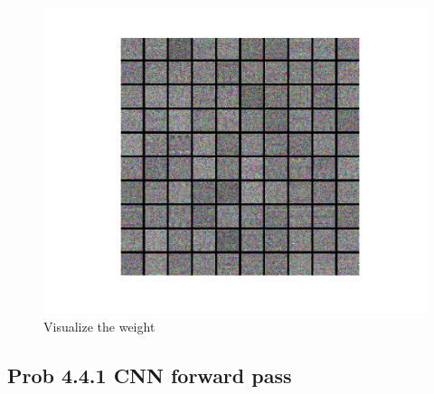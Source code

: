 \documentclass[12pt]{article}
\begin{document}
\begin{figure}[H]
  \caption{Visualize the weight}
  \centering
    \includegraphics[scale=0.5]{visual.png}
\end{figure}


\subsection*{Prob 4.4.1 CNN forward pass}
\end{document}
